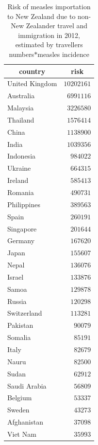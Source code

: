 \documentclass{article}
\begin{document}
\begin{itemize}
\begin{table}
\caption{Risk of measles importation to New Zealand due to non-New Zealander travel and immigration in 2012, estimated by travellers numbers$*$measles incidence}
\begin{center}
\begin{tabular}{lr}
\hline\hline
\multicolumn{1}{c}{country}&\multicolumn{1}{c}{risk}\tabularnewline
\hline
United Kingdom&$10202161$\tabularnewline
Australia&$ 6991116$\tabularnewline
Malaysia&$ 3226580$\tabularnewline
Thailand&$ 1576414$\tabularnewline
China&$ 1138900$\tabularnewline
India&$ 1039356$\tabularnewline
Indonesia&$  984022$\tabularnewline
Ukraine&$  664315$\tabularnewline
Ireland&$  585413$\tabularnewline
Romania&$  490731$\tabularnewline
Philippines&$  389563$\tabularnewline
Spain&$  260191$\tabularnewline
Singapore&$  201644$\tabularnewline
Germany&$  167620$\tabularnewline
Japan&$  155607$\tabularnewline
Nepal&$  136076$\tabularnewline
Israel&$  133876$\tabularnewline
Samoa&$  129878$\tabularnewline
Russia&$  120298$\tabularnewline
Switzerland&$  113281$\tabularnewline
Pakistan&$   90079$\tabularnewline
Somalia&$   85191$\tabularnewline
Italy&$   82679$\tabularnewline
Nauru&$   82500$\tabularnewline
Sudan&$   62912$\tabularnewline
Saudi Arabia&$   56809$\tabularnewline
Belgium&$   53337$\tabularnewline
Sweden&$   43273$\tabularnewline
Afghanistan&$   37098$\tabularnewline
Viet Nam&$   35993$\tabularnewline
\hline
\end{tabular}\end{center}\label{table:imrisk12}
\end{table}


\end{itemize}
\end{document}
